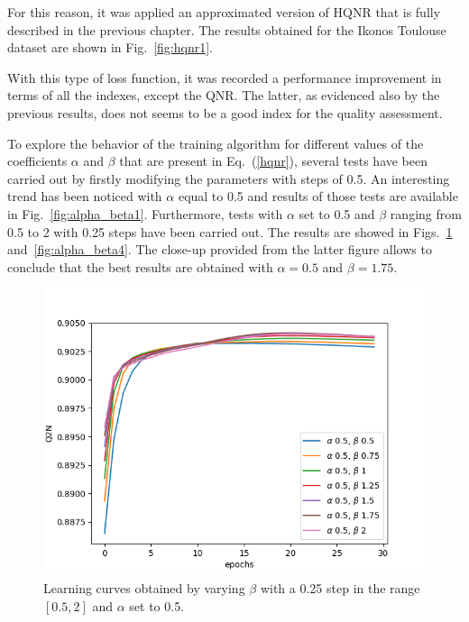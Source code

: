 \documentclass[12pt]{report}
\begin{document}
For this reason, it was applied an approximated version of HQNR that is fully described in the previous chapter. The results obtained for the Ikonos Toulouse dataset are shown in Fig.~\ref{fig:hqnr1}. 

With this type of loss function, it was recorded a performance improvement in terms of all the indexes, except the QNR.
The latter, as evidenced also by the previous results, does not seems to be a good index for the quality assessment.

To explore the behavior of the training algorithm for different values of the coefficients $\alpha$ and $\beta$ that are present in Eq.~(\ref{hqnr}), several tests have been carried out by firstly modifying the parameters with steps of 0.5. 
An interesting trend has been noticed with $\alpha$ equal to 0.5 and results of those tests are available in Fig.~\ref{fig:alpha_beta1}.
Furthermore, tests with $\alpha$ set to 0.5 and $\beta$ ranging from 0.5 to 2 with 0.25 steps have been carried out. The results are showed in Figs.~\ref{fig:alpha_beta3} and~\ref{fig:alpha_beta4}. The close-up provided from the latter figure allows to conclude that the best results are obtained with $\alpha=0.5$ and $\beta=1.75$. 



\begin{figure}
    \centering
    \includegraphics[scale=.7]{alpha_beta3.png}
    \caption{Learning curves obtained by varying $\beta$ with a 0.25 step in the range $[0.5,2]$ and $\alpha$ set to 0.5.}
    \label{fig:alpha_beta3}
\end{figure}
\end{document}
